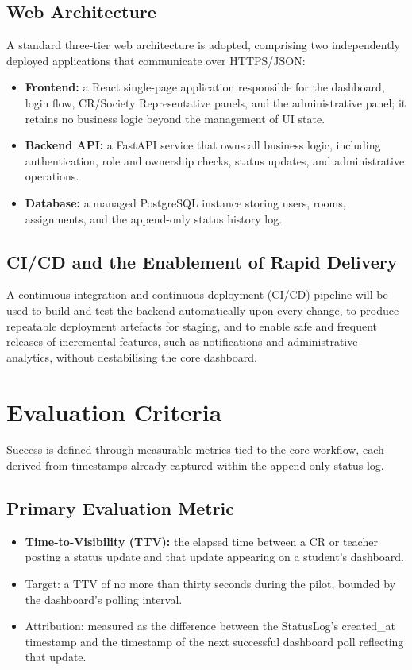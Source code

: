 \documentclass[11pt]{article}
\begin{document}
\subsection{Web Architecture}

A standard three-tier web architecture is adopted, comprising two independently deployed applications that communicate over HTTPS/JSON:

\begin{itemize}
    \item \textbf{Frontend:} a React single-page application responsible for the dashboard, login flow, CR/Society Representative panels, and the administrative panel; it retains no business logic beyond the management of UI state.
    \item \textbf{Backend API:} a FastAPI service that owns all business logic, including authentication, role and ownership checks, status updates, and administrative operations.
    \item \textbf{Database:} a managed PostgreSQL instance storing users, rooms, assignments, and the append-only status history log.
\end{itemize}

\subsection{CI/CD and the Enablement of Rapid Delivery}

A continuous integration and continuous deployment (CI/CD) pipeline will be used to build and test the backend automatically upon every change, to produce repeatable deployment artefacts for staging, and to enable safe and frequent releases of incremental features, such as notifications and administrative analytics, without destabilising the core dashboard.

\section{Evaluation Criteria}

Success is defined through measurable metrics tied to the core workflow, each derived from timestamps already captured within the append-only status log.

\subsection{Primary Evaluation Metric}

\begin{itemize}
    \item \textbf{Time-to-Visibility (TTV):} the elapsed time between a CR or teacher posting a status update and that update appearing on a student's dashboard.
    \item Target: a TTV of no more than thirty seconds during the pilot, bounded by the dashboard's polling interval.
    \item Attribution: measured as the difference between the StatusLog's created\_at timestamp and the timestamp of the next successful dashboard poll reflecting that update.
\end{itemize}
\end{document}

